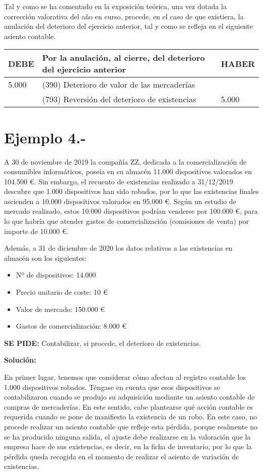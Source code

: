 \documentclass{article}
\begin{document}
Tal y como se ha comentado en la exposición teórica, una vez dotada la corrección valorativa del año en curso, procede, en el caso de que existiera, la anulación del deterioro del ejercicio anterior, tal y como se refleja en el siguiente asiento contable.

\begin{table}[H]
    \centering
    \begin{tabular}{|p{4cm}|p{4cm}|p{4cm}|}
        \hline
        \textbf{DEBE} & \textbf{Por la anulación, al cierre, del deterioro del ejercicio anterior} & \textbf{HABER} \\
        \hline
        5.000 & (390) Deterioro de valor de las mercaderías &  \\
         & (793) Reversión del deterioro de existencias & 5.000 \\
        \hline
    \end{tabular}
\end{table}

\section*{Ejemplo 4.-} A 30 de noviembre de 2019 la compañía ZZ, dedicada a la comercialización de consumibles informáticos, poseía en su almacén 11.000 dispositivos valorados en 104.500 €. Sin embargo, el recuento de existencias realizado a 31/12/2019 descubre que 1.000 dispositivos han sido robados, por lo que las existencias finales ascienden a 10.000 dispositivos valorados en 95.000 €. Según un estudio de mercado realizado, estos 10.000 dispositivos podrían venderse por 100.000 €, para lo que habría que atender gastos de comercialización (comisiones de venta) por importe de 10.000 €.

Además, a 31 de diciembre de 2020 los datos relativos a las existencias en almacén son los siguientes:
\begin{itemize}
    \item Nº de dispositivos: 14.000
    \item Precio unitario de coste: 10 €
    \item Valor de mercado: 150.000 €
    \item Gastos de comercialización: 8.000 €
\end{itemize}

\textbf{SE PIDE:} Contabilizar, si procede, el deterioro de existencias.

\textbf{Solución:}

En primer lugar, tenemos que considerar cómo afectan al registro contable los 1.000 dispositivos robados. Téngase en cuenta que esos dispositivos se contabilizaron cuando se produjo su adquisición mediante un asiento contable de compras de mercaderías. En este sentido, cabe plantearse qué acción contable es requerida cuando se pone de manifiesto la existencia de un robo. En este caso, no procede realizar un asiento contable que refleje esta pérdida, porque realmente no se ha producido ninguna salida, el ajuste debe realizarse en la valoración que la empresa hace de sus existencias, es decir, en la ficha de inventario, por lo que la pérdida queda recogida en el momento de realizar el asiento de variación de existencias.
\end{document}
